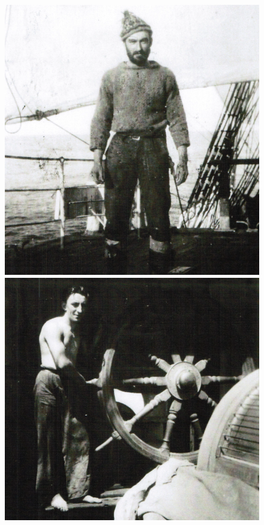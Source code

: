 \documentclass[
  11pt,
  msmallroyalvopaper
]{memoir}
\begin{document}
\begin{figure}
\centering
\begin{minipage}{.5\textwidth}
	\centering
	\includegraphics[width=.8\linewidth]{./images/image032.png}
\end{minipage}%
\begin{minipage}{.5\textwidth}
	\centering
	\includegraphics[width=.8\linewidth]{./images/image033.png}
\end{minipage}
\end{figure}
\end{document}
